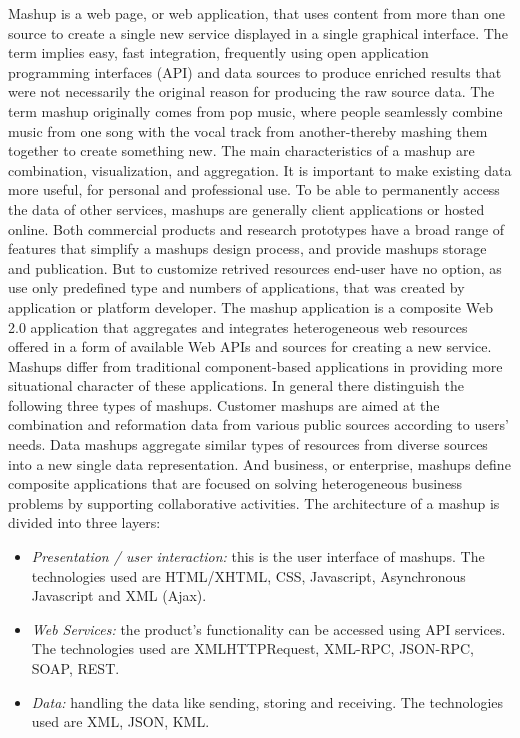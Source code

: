 		Mashup is a web page, or web application, that uses content from more than one source to create a single new service displayed in a single graphical interface. The term implies easy, fast integration, frequently using open application programming interfaces (API) and data sources to produce enriched results that were not necessarily the original reason for producing the raw source data. The term mashup originally comes from pop music, where people seamlessly combine music from one song with the vocal track from another-thereby mashing them together to create something new. The main characteristics of a mashup are combination, visualization, and aggregation. It is important to make existing data more useful, for personal and professional use. To be able to permanently access the data of other services, mashups are generally client applications or hosted online. Both commercial products and research prototypes have a broad range of features that simplify a mashups design process, and provide mashups storage and publication. But to customize retrived resources end-user have no option, as use only predefined type and numbers of applications, that was created by application or platform developer. 
		The mashup application is a composite Web 2.0 application that aggregates and integrates heterogeneous web resources offered in a form of available Web APIs and sources for creating a new service. Mashups differ from traditional component-based applications in providing more situational character of these applications\cite{yu2008understanding}. In general there distinguish the following three types of mashups\cite{ibrahim2012framework}. Customer mashups are aimed at the combination and reformation data from various public sources according to users’ needs. Data mashups aggregate similar types of resources from diverse sources into a new single data representation. And business, or enterprise, mashups define composite applications that are focused on solving heterogeneous business problems by supporting collaborative activities\cite{hoyer2008enterprise}. The architecture of a mashup is divided into three layers:
		 \begin{itemize}
		\item \emph{Presentation / user interaction:} this is the user interface of mashups. The technologies used are HTML/XHTML, CSS, Javascript, Asynchronous Javascript and XML (Ajax).
		\item \emph{Web Services:} the product's functionality can be accessed using API services. The technologies used are XMLHTTPRequest, XML-RPC, JSON-RPC, SOAP, REST.
		\item \emph{Data:} handling the data like sending, storing and receiving. The technologies used are XML, JSON, KML.
		\end{itemize}


